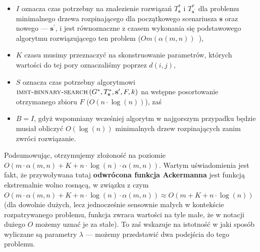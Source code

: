 {\begin{itemize}
	\item $I$ oznacza czas potrzebny na znalezienie rozwiązań $T^{\ast}_{\textbf{s}}$ i $T^{\ast}_{\textbf{s}^{\prime}}$ dla problemu minimalnego drzewa rozpinającego dla początkowego scenariusza $\textbf{s}$ oraz nowego --- $\textbf{s}^{\prime}$, i jest równoznaczne z czasem wykonania się podstawowego algorytmu rozwiązującego ten problem ($O m \left( \alpha \left( m, n \right) \right)$~\cite{Chazelle:2000:MST:355541.355562}),
	\item $K$ czasu musimy przeznaczyć na skonstruowanie parametrów, których wartości do tej pory oznaczaliśmy poprzez $d \left( i, j \right)$,
	\item $S$ oznacza czas potrzebny algorytmowi $\textsc{imst-binnary-search} \left( G^{\ast}, T^{\ast}_{\textbf{s}}, \textbf{s}^{\prime}, F, k \right)$ na wstępne posortowanie otrzymanego zbioru $F$ ($O \left( n \cdot \log \left( n \right) \right)$), zaś
	\item $B = I$, gdyż wspomniany wcześniej algorytm w najgorszym przypadku będzie musiał obliczyć $O \left( \log \left( n \right) \right)$ minimalnych drzew rozpinających zanim zwróci rozwiązanie.
\end{itemize}

Podsumowując, otrzymujemy złożoność na poziomie $O \left( m \cdot \alpha \left( m, n \right) + K + n \cdot \log \left( n \right) \cdot \alpha \left( m, n \right) \right)$. Wartym uświadomienia jest fakt, że przywoływana tutaj \textbf{odwrócona funkcja Ackermanna} jest funkcją ekstremalnie wolno rosnącą, w związku z czym $O \left( m \cdot \alpha \left( m, n \right) + K + n \cdot \log \left( n \right) \cdot \alpha \left( m, n \right) \right) \approx O \left( m + K + n \cdot \log \left( n \right) \right)$ (dla dowolnie dużych, lecz jednocześnie sensownie małych w kontekście rozpatrywanego problemu, funkcja zwraca wartości na tyle małe, że w notacji dużego $O$ możemy uznać je za stałe). To zaś wskazuje na istotność w jaki sposób wyliczane są parametry $\lambda$ --- możemy przedstawić dwa podejścia do tego problemu.

}
